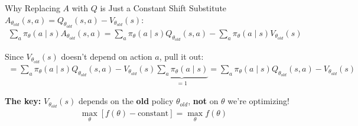 \documentclass[aspectratio=169]{beamer}
\begin{document}
\begin{frame}[label=advantage-to-q-explanation]{Why Replacing $A$ with $Q$ is Just a Constant Shift}
  \small
  Substitute $A_{\theta_{old}}(s,a) = Q_{\theta_{old}}(s,a) - V_{\theta_{old}}(s)$:
  \begin{gather*}
    \sum_a \pi_\theta(a\mid s) A_{\theta_{old}}(s,a) = \sum_a \pi_\theta(a\mid s) Q_{\theta_{old}}(s,a) - \sum_a \pi_\theta(a\mid s) V_{\theta_{old}}(s)
  \end{gather*}

  \vspace{2pt}
  Since $V_{\theta_{old}}(s)$ doesn't depend on action $a$, pull it out:
  \begin{gather*}
    = \sum_a \pi_\theta(a\mid s) Q_{\theta_{old}}(s,a) - V_{\theta_{old}}(s) \underbrace{\sum_a \pi_\theta(a\mid s)}_{=1}
    = \sum_a \pi_\theta(a\mid s) Q_{\theta_{old}}(s,a) - V_{\theta_{old}}(s)
  \end{gather*}

  \vspace{3pt}
  \textbf{The key:} $V_{\theta_{old}}(s)$ depends on the \textbf{old} policy $\theta_{old}$, \textbf{not} on $\theta$ we're optimizing!
  \begin{gather*}
    \max_\theta [f(\theta) - \text{constant}] = \max_\theta f(\theta)
  \end{gather*}

  \vspace{4pt}
  \centering
  \hyperlink{sampling-main}{}

\end{frame}
\end{document}
